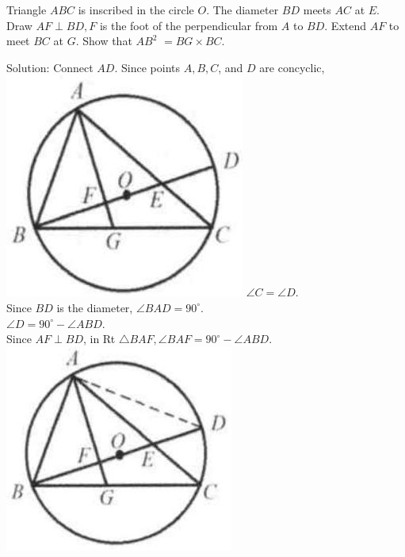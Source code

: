 \documentclass{article}
\begin{document}
Triangle \(A B C\) is inscribed in the circle \(O\). The diameter \(B D\) meets \(A C\) at \(E\). Draw \(A F \perp B D, F\) is the foot of the perpendicular from \(A\) to \(B D\). Extend \(A F\) to meet \(B C\) at \(G\). Show that \(A B^{2}\) \(=B G \times B C\).

Solution:
Connect \(A D\). Since points \(A, B, C\), and \(D\) are concyclic,\\
\includegraphics[width=\textwidth]{images/165(4).jpg} \(\angle C=\angle D\).\\
Since \(B D\) is the diameter, \(\angle B A D=90^{\circ}\).\\
\(\angle D=90^{\circ}-\angle A B D\).\\
Since \(A F \perp B D\), in Rt \(\triangle B A F, \angle B A F=90^{\circ}-\angle A B D\).\\
\centering
\includegraphics[width=\textwidth]{images/165(2).jpg}
\end{document}
